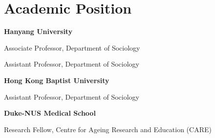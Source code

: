 \section{Academic Position}

\begin{aka}[noitemsep]
    \item [] \textbf{Hanyang University}

    \item [2026--\textnormal{Present}] Associate Professor, Department of Sociology
    \item [2024--2026] Assistant Professor, Department of Sociology
\end{aka}

\begin{aka}[noitemsep]
    \item [] \textbf{Hong Kong Baptist University}
    \item [2023--2024] Assistant Professor, Department of Sociology
\end{aka}

\begin{aka}[noitemsep]
    \item [] \textbf{Duke-NUS Medical School}
    \item [2020--2023] Research Fellow, Centre for Ageing Research and Education (CARE)
\end{aka}


